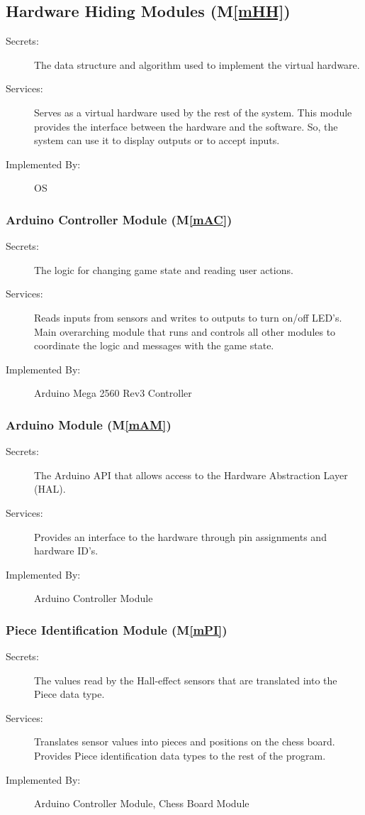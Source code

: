 \documentclass[12pt, titlepage]{article}
\newcommand{\mref}[1]{M\ref{#1}}
\begin{document}
\subsection{Hardware Hiding Modules (\mref{mHH})}

\begin{description}
\item[Secrets:]The data structure and algorithm used to implement the virtual
  hardware.
\item[Services:]Serves as a virtual hardware used by the rest of the
  system. This module provides the interface between the hardware and the
  software. So, the system can use it to display outputs or to accept inputs.
\item[Implemented By:] OS
\end{description}

\subsubsection{Arduino Controller Module (\mref{mAC})}
\begin{description}
\item[Secrets:] The logic for changing game state and reading user actions.
\item[Services:] Reads inputs from sensors and writes to outputs to turn on/off LED's. Main overarching module that runs and controls all other modules to coordinate the logic and messages with the game state.
\item[Implemented By:] Arduino Mega 2560 Rev3 Controller
\end{description}

\subsubsection{Arduino Module (\mref{mAM})}
\begin{description}
\item[Secrets:] The Arduino API that allows access to the Hardware Abstraction Layer (HAL).
\item[Services:] Provides an interface to the hardware through pin assignments and hardware ID's.
\item[Implemented By:] Arduino Controller Module
\end{description}

\subsubsection{Piece Identification Module (\mref{mPI})}
\begin{description}
\item[Secrets:] The values read by the Hall-effect sensors that are translated into the Piece data type.
\item[Services:] Translates sensor values into pieces and positions on the chess board. Provides Piece identification data types to the rest of the program.
\item[Implemented By:] Arduino Controller Module, Chess Board Module
\end{description}
\end{document}
